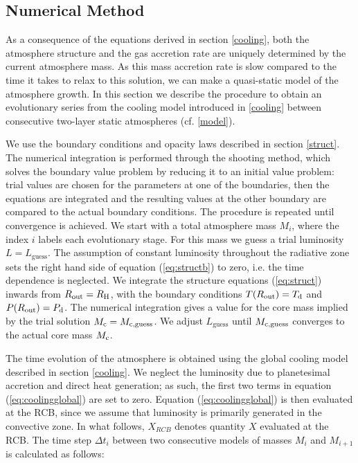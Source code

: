 \documentclass[apj]{emulateapj}
\begin{document}
\subsection{Numerical Method}
\label{twolayer}


As a consequence of the equations derived in section \ref{cooling}, both the atmosphere structure and the gas accretion rate are uniquely determined by the current atmosphere mass. As this mass accretion rate is slow compared to the time it takes to relax to this solution, we can make a quasi-static model of the atmosphere growth. In this section we describe the procedure to obtain an evolutionary series from the cooling model introduced in \ref{cooling} between consecutive two-layer static atmospheres (cf. \ref{model}).

We use the boundary conditions and opacity laws described in section \ref{struct}. The numerical integration is performed through the shooting method, which solves the boundary value problem by reducing it to an initial value problem: trial values are chosen for the parameters at one of the boundaries, then the equations are integrated and the resulting values at the other boundary are compared to the actual boundary conditions. The procedure is repeated until convergence is achieved. We start with a total atmosphere mass $M_i$, where the index $i$ labels each evolutionary stage. For this mass we guess a trial luminosity $L=L_{\mathrm{guess}}$. The assumption of constant luminosity throughout the radiative zone sets the right hand side of equation (\ref{eq:structb}) to zero, i.e. the time dependence is neglected. We integrate the structure equations (\ref{eq:struct}) inwards from $R_{\mathrm{out}}=R_{\rm H}$, with the boundary conditions $T(R_{\mathrm{out}})=T_{\rm d}$ and $P(R_{\mathrm{out}})=P_{\rm d}$. The numerical integration gives a value for the core mass implied by the trial solution $M_{\rm c}=M_{\rm{c, guess}}$. We adjust $L_{\mathrm{guess}}$ until $M_{\rm{c,guess}}$ converges to the actual core mass $M_{\rm c}$. 

The time evolution of the atmosphere is obtained using the global cooling model described in section \ref{cooling}. We neglect the luminosity due to planetesimal accretion and direct heat generation; as such, the first two terms in equation (\ref{eq:coolingglobal}) are set to zero. Equation (\ref{eq:coolingglobal}) is then evaluated at the RCB, since we assume that luminosity is primarily generated in the convective zone. In what follows, $X_{RCB}$ denotes quantity $X$ evaluated at the RCB. The time step $\Delta t_i$ between two consecutive models of masses $M_i$ and $M_{i+1}$ is calculated as follows:
\end{document}
